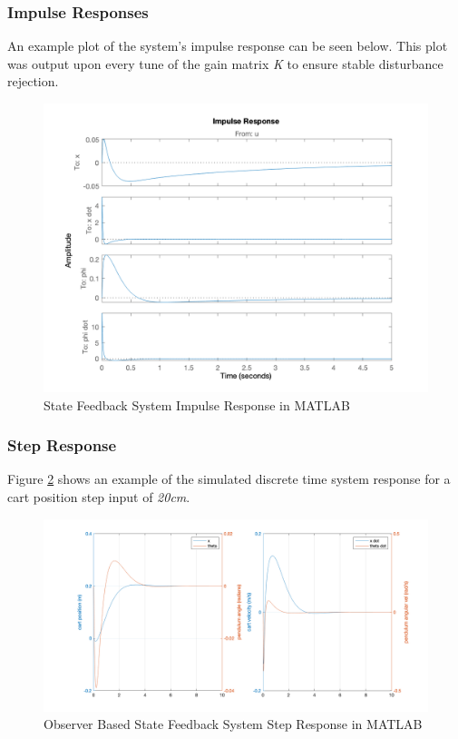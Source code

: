 \documentclass[12pt]{article}
\begin{document}
\subsubsection{Impulse Responses}
An example plot of the system's impulse response can be seen below. This plot was output upon every tune of the gain matrix \textit{K} to ensure stable disturbance rejection.
\begin{figure}[H]
    \centering
    \includegraphics[width=0.7\linewidth]{figures/impulse.png}
    \caption{State Feedback System Impulse Response in MATLAB}
    \label{fig:imp}
\end{figure}

\subsubsection{Step Response}
Figure \ref{fig:sim} shows an example of the simulated discrete time system response for a cart position step input of \textit{20cm}.
\begin{figure}[H]
    \centering
    \includegraphics[width=1\linewidth]{figures/models.png}
    \caption{Observer Based State Feedback System Step Response in MATLAB}
    \label{fig:sim}
\end{figure}
\end{document}
